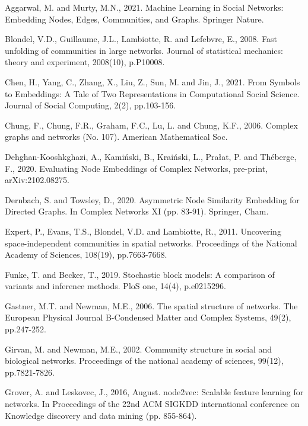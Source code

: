 \documentclass[11pt]{article}
\begin{document}
\begin{thebibliography}{10}

 Aggarwal, M. and Murty, M.N., 2021. Machine Learning in Social Networks: Embedding Nodes, Edges, Communities, and Graphs. Springer Nature.

 Blondel, V.D., Guillaume, J.L., Lambiotte, R. and Lefebvre, E., 2008. Fast unfolding of communities in large networks. Journal of statistical mechanics: theory and experiment, 2008(10), p.P10008.

 Chen, H., Yang, C., Zhang, X., Liu, Z., Sun, M. and Jin, J., 2021. From Symbols to Embeddings: A Tale of Two Representations in Computational Social Science. Journal of Social Computing, 2(2), pp.103-156.

 Chung, F., Chung, F.R., Graham, F.C., Lu, L. and Chung, K.F., 2006. Complex graphs and networks (No. 107). American Mathematical Soc.

 Dehghan-Kooshkghazi, A., Kamiński, B., Kraiński, L., Prałat, P. and Théberge, F., 2020.  Evaluating Node Embeddings of Complex Networks, pre-print, arXiv:2102.08275.

 Dernbach, S. and Towsley, D., 2020. Asymmetric Node Similarity Embedding for Directed Graphs. In Complex Networks XI (pp. 83-91). Springer, Cham.

 Expert, P., Evans, T.S., Blondel, V.D. and Lambiotte, R., 2011. Uncovering space-independent communities in spatial networks. Proceedings of the National Academy of Sciences, 108(19), pp.7663-7668.

 Funke, T. and Becker, T., 2019. Stochastic block models: A comparison of variants and inference methods. PloS one, 14(4), p.e0215296.

 Gastner, M.T. and Newman, M.E., 2006. The spatial structure of networks. The European Physical Journal B-Condensed Matter and Complex Systems, 49(2), pp.247-252.

 Girvan, M. and Newman, M.E., 2002. Community structure in social and biological networks. Proceedings of the national academy of sciences, 99(12), pp.7821-7826.

 Grover, A. and Leskovec, J., 2016, August. node2vec: Scalable feature learning for networks. In Proceedings of the 22nd ACM SIGKDD international conference on Knowledge discovery and data mining (pp. 855-864).


\end{thebibliography}
\end{document}
